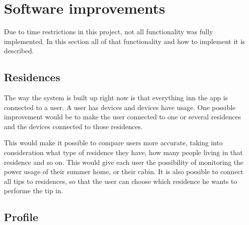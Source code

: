 \section{Software improvements}
Due to time restrictions in this project, not all functionality was fully implemented. In this section all of that functionality and how to implement it is described. 

\subsection{Residences}
The way the system is built up right now is that everything inn the app is connected to a user. A user has devices and devices have usage. One possible improvement would be to make the user connected to one or several residences and the devices connected to those residences. 

This would make it possible to compare users more accurate, taking into consideration what type of residence they have, how many people living in that residence and so on. This would give each user the possibility of monitoring the power usage of their summer home, or their cabin. It is also possible to connect all tips to residences, so that the user can choose which residence he wants to performe the tip in. 

\subsection{Profile}
